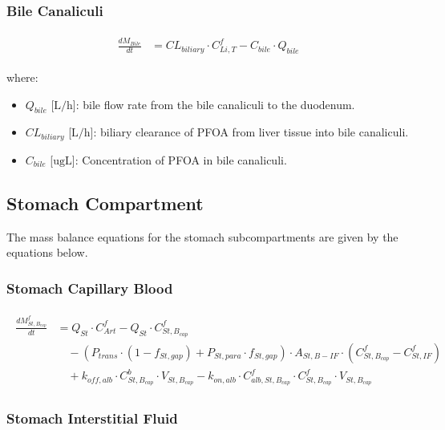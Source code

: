 \documentclass[preprint,12pt,authoryear]{elsarticle}
\begin{document}
\subsubsection{Bile Canaliculi}

\begin{align}
\begin{aligned}
\frac{dM_{Bile}}{dt} &= CL_{biliary} \cdot C_{Li,T}^f
- C_{bile} \cdot Q_{bile}
\end{aligned}
\label{eq:PFOA_bile_canaliculi}
\end{align}

\noindent 
where:
\begin{itemize} 
\item $Q_{bile}$ [$\text{L}/\text{h}$]: bile flow rate from the bile canaliculi to the duodenum. 
\item $CL_{biliary}$ [$\text{L}/\text{h}$]: biliary clearance of PFOA from liver tissue into bile canaliculi. 
\item  $C_{bile}$ [$\text{ug}\text{L}$]: Concentration of PFOA in bile canaliculi.
\end{itemize}


\subsection{Stomach Compartment}

The mass balance equations for the stomach subcompartments are given by the equations below.

\subsubsection{Stomach Capillary Blood}

\begin{align}
\begin{aligned}
\frac{dM_{St,B_{cap}}^f}{dt} &= Q_{St} \cdot C_{Art}^f 
- Q_{St} \cdot C_{St,B_{cap}}^f \\
& \quad - (P_{trans}\cdot  (1-f_{St,gap}) + P_{St,para} \cdot f_{St,gap})\cdot A_{St,B-IF} \cdot (C_{St,B_{cap}}^f - C_{St,IF}^f) \\
& \quad + k_{off,alb} \cdot C_{St,B_{cap}}^b \cdot V_{St,B_{cap}}
- k_{on,alb} \cdot C_{alb,St,B_{cap}}^f \cdot C_{St,B_{cap}}^f \cdot V_{St,B_{cap}}
\end{aligned}
\label{eq:PFOA_stomach_blood}
\end{align}

\subsubsection{Stomach Interstitial Fluid}
\end{document}
